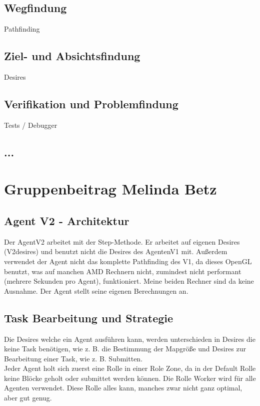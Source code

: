 \documentclass[runningheads]{llncs}
\begin{document}
\subsection{Wegfindung}
Pathfinding

\subsection{Ziel- und Absichtsfindung}
Desires

\subsection{Verifikation und Problemfindung}
Tests / Debugger

\subsection{...}

\section{Gruppenbeitrag Melinda Betz}
\subsection{Agent V2 - Architektur}
Der AgentV2 arbeitet mit der Step-Methode. 
Er arbeitet auf eigenen Desires (V2desires) und benutzt nicht die Desires des AgentenV1 mit. Außerdem verwendet der Agent nicht das komplette Pathfinding des V1, da dieses OpenGL benutzt, was auf manchen AMD Rechnern nicht, zumindest nicht performant (mehrere Sekunden pro Agent), funktioniert. Meine beiden Rechner sind da keine Ausnahme. Der Agent stellt seine eigenen Berechnungen an. 
 

\subsection{Task Bearbeitung und Strategie}
Die Desires welche ein Agent ausführen kann, werden unterschieden in Desires die keine Task benötigen, wie z. B. die Bestimmung der Mapgröße und Desires zur Bearbeitung einer Task, wie z. B. Submitten.\\

Jeder Agent holt sich zuerst eine Rolle in einer Role Zone, da in der Default Rolle keine Blöcke geholt oder submittet werden können. Die Rolle Worker wird für alle Agenten verwendet. Diese Rolle alles kann, manches zwar nicht ganz optimal, aber gut genug.\\
\end{document}
